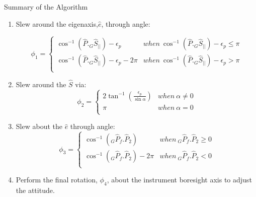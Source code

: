 \documentclass{beamer}
\begin{document}
\begin{frame}
\begin{block}{Summary of the Algorithm}
\begin{enumerate}
\item Slew around the eigenaxis,$\hat{e}$, through angle:

 \begin{equation}\label{phi1}
 \phi_1=\left\{
                \begin{array}{ll}
                 \cos^{-1}(\hat{P}._G\hat{S}_{||})-\epsilon_p& when\  \cos^{-1}(\hat{P}._G\hat{S}_{||})-\epsilon_p\leq \pi\\
                 \cos^{-1}(\hat{P}._G\hat{S}_{||})-\epsilon_p-2\pi& when\ \cos^{-1}(\hat{P}._G\hat{S}_{||})-\epsilon_p>\pi\\
                \end{array}
              \right.
 \end{equation}
\item Slew around the $\hat{S}$ via:
 \begin{equation}\label{phi2}
 \phi_2=\left\{
                \begin{array}{ll}
                  2\tan^{-1}(\frac{\epsilon_p}{\sin\alpha})& when\  \alpha\neq 0\\
                 \pi& when\ \alpha=0\\
                \end{array}
              \right.
 \end{equation}
 \item Slew about the $\hat{e}$ through angle:
 \begin{equation}\label{phi3}
 \phi_3=\left\{
                \begin{array}{ll}
                  \cos^{-1}(_G\hat{P}_f.\hat{P}_2)& when\  _G\hat{P}_f.\hat{P}_2\geq 0\\
                 \cos^{-1}(_G\hat{P}_f.\hat{P}_2)-2\pi& when\ _G\hat{P}_f.\hat{P}_2<0\\
                \end{array}
              \right.
 \end{equation}

\item Perform the final rotation, $\phi_4$, about the instrument boresight axis to adjust the attitude. 
\end{enumerate}
\end{block}
\end{frame}
\end{document}
